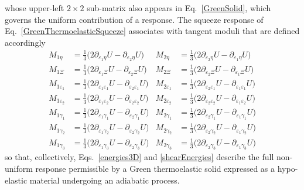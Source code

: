 \normalsize
whose upper-left $2\times 2$ sub-matrix also appears in Eq.~\ref{GreenSolid}, which governs the uniform contribution of a response.  The squeeze response of Eq.~\ref{GreenThermoelasticSqueeze} associates with tangent moduli that are defined accordingly
\begin{subequations}  
    \label{shearEnergies}
    \begin{align}
    M_{1\eta} & = \tfrac{1}{3} \bigl( 2 \partial_{\varepsilon_1 \eta} U -
        \partial_{\varepsilon_2 \eta} U \bigr) &
    M_{2\eta} & = \tfrac{1}{3} \bigl( 2 \partial_{\varepsilon_2 \eta} U -
    \partial_{\varepsilon_1 \eta} U \bigr) \\
    M_{1\Xi} & = \tfrac{1}{3} \bigl( 2 \partial_{\varepsilon_1 \Xi} U -
    \partial_{\varepsilon_2 \Xi} U \bigr) &
    M_{2\Xi} & = \tfrac{1}{3} \bigl( 2 \partial_{\varepsilon_2 \Xi} U -
    \partial_{\varepsilon_1 \Xi} U \bigr) \\
    M_{1\varepsilon_1} & = \tfrac{1}{3} \bigl( 2 \partial_{\varepsilon_1 \varepsilon_1} U -
    \partial_{\varepsilon_2 \varepsilon_1} U \bigr) & 
    M_{2\varepsilon_1} & = \tfrac{1}{3} \bigl( 2 \partial_{\varepsilon_2 \varepsilon_1} U -
    \partial_{\varepsilon_1 \varepsilon_1} U \bigr) \\
    M_{1\varepsilon_2} & = \tfrac{1}{3} \bigl( 2 \partial_{\varepsilon_1 \varepsilon_2} U -
    \partial_{\varepsilon_2 \varepsilon_2} U \bigr) & 
    M_{2\varepsilon_2} & = \tfrac{1}{3} \bigl( 2 \partial_{\varepsilon_2 \varepsilon_2} U -
    \partial_{\varepsilon_1 \varepsilon_2} U \bigr) \\
    M_{1\gamma_1} & = \tfrac{1}{3} \bigl( 2 \partial_{\varepsilon_1 \gamma_1} U -
    \partial_{\varepsilon_2 \gamma_1} U \bigr) &
    M_{2\gamma_1} & = \tfrac{1}{3} \bigl( 2 \partial_{\varepsilon_2 \gamma_1} U -
    \partial_{\varepsilon_1 \gamma_1} U \bigr) \\
    M_{1\gamma_2} & = \tfrac{1}{3} \bigl( 2 \partial_{\varepsilon_1 \gamma_2} U -
    \partial_{\varepsilon_2 \gamma_2} U \bigr) &
    M_{2\gamma_2} & = \tfrac{1}{3} \bigl( 2 \partial_{\varepsilon_2 \gamma_2} U -
    \partial_{\varepsilon_1 \gamma_2} U \bigr) \\
    M_{1\gamma_3} & = \tfrac{1}{3} \bigl( 2 \partial_{\varepsilon_1 \gamma_3} U -
    \partial_{\varepsilon_2 \gamma_3} U \bigr) &
    M_{2\gamma_3} & = \tfrac{1}{3} \bigl( 2 \partial_{\varepsilon_2 \gamma_3} U -
    \partial_{\varepsilon_1 \gamma_3} U \bigr)
    \end{align}
\end{subequations}
so that, collectively, Eqs.~\ref{energies3D} and \ref{shearEnergies} describe the full non-uniform response permissible by a Green thermo\-elastic solid expressed as a hypo-elastic material undergoing an adiabatic process.

